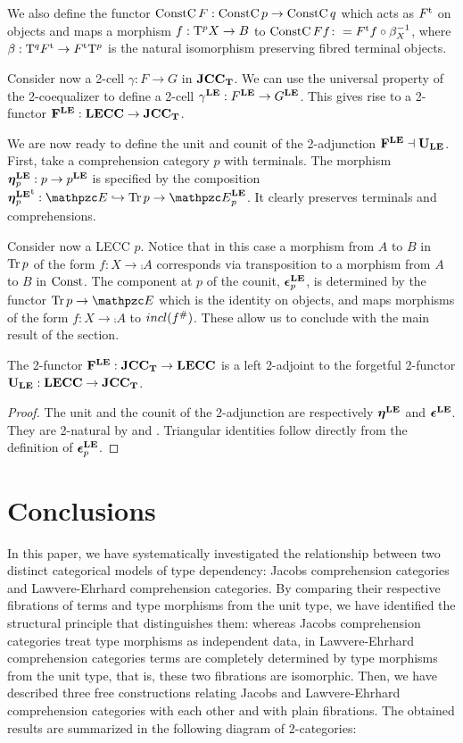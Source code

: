 \documentclass{lmcs} %
\theoremstyle{plain}\newtheorem{satz}[thm]{Satz} %
\begin{document}
			We also define the functor $\mathop{\mathrm{ConstC}}\nolimits{F}:\mathop{\mathrm{ConstC}}\nolimits{p}\to\mathop{\mathrm{ConstC}}\nolimits{q}$ which acts as ${F}^{\mathrm{t}}$ on objects and maps a morphism $f:\mathrm{T}^{p}X\to B$ to $\mathop{\mathrm{ConstC}}\nolimits{F}f\colon = {F}^{\mathrm{t}}f\circ \beta^{-1}_X$, where $\beta:\mathrm{T}^{q}{F}^{\mathrm{t}}\to{F}^{\mathrm{t}}\mathrm{T}^{p}$ is the natural isomorphism preserving fibred terminal objects.
			
			Consider now a 2-cell $\gamma:F\to G$ in $\mathbf{JCC_T}$. We can use the universal property of the 2-coequalizer to define a 2-cell ${\gamma}^{\mathbf{LE}}:{F}^{\mathbf{LE}}\to{G}^{\mathbf{LE}}$. This gives rise to a 2-functor $\mathbf{F^{LE}}:\mathbf{LECC}\to\mathbf{JCC_T}$.
			
			We are now ready to define the unit and counit of the 2-adjunction $\mathbf{F^{LE}}\dashv\mathbf{U_{LE}}$. First, take a comprehension category $p$ with terminals. The morphism $\boldsymbol{\eta}^{\mathbf{LE}}_{p}:p\to{p}^{\mathbf{LE}}$ is specified by the composition $\ft{\LEun{p}}:\ct{E}\hookrightarrow\Tr{p}\to\LEDomE{p}$. It clearly preserves terminals and comprehensions.
			
			Consider now a LECC $p$. Notice that in this case a morphism from $A$ to $B$ in $\mathop{\mathrm{Tr}}\nolimits{p}$ of the form $f:X\to\comp{}A$ corresponds via transposition to a morphism from $A$ to $B$ in $\mathop{\mathrm{Const}}\nolimits$. The component at $p$ of the counit, $\boldsymbol{\epsilon}^{\mathbf{LE}}_{p}$, is determined by the functor $\Tr{p}\to \ct{E}$ which is the identity on objects, and maps morphisms of the form $f:X\to\comp{}A$ to $incl (f^{\#})$. These allow us to conclude with the main result of the section.
			
			\begin{thm}
				The 2-functor $\mathbf{F^{LE}}:\mathbf{JCC_T}\to\mathbf{LECC}$ is a left 2-adjoint to the forgetful 2-functor $\mathbf{U_{LE}}:\mathbf{LECC}\to \mathbf{JCC_T}$.
			\end{thm}
			
			\begin{proof}
				The unit and the counit of the 2-adjunction are respectively $\boldsymbol{\eta}^{\mathbf{LE}}_{}$ and $\boldsymbol{\epsilon}^{\mathbf{LE}}_{}$. They are 2-natural by  and . Triangular identities follow directly from the definition of $\boldsymbol{\epsilon}^{\mathbf{LE}}_{p}$.
			\end{proof}



			\section{Conclusions}
			\label{sect:conclu} 

In this paper, we have systematically investigated the relationship between two distinct categorical models of type dependency: Jacobs comprehension categories and Lawvere-Ehrhard comprehension categories. 
By comparing their respective fibrations of terms and type morphisms from the unit type, we have identified the structural principle that distinguishes them: 
whereas Jacobs comprehension categories treat type morphisms as independent data, 
in Lawvere-Ehrhard comprehension categories terms are completely determined by type morphisms from the unit type,  that is, 
 these two fibrations are isomorphic. 
% 
Then, we have described three free constructions relating Jacobs and Lawvere-Ehrhard comprehension categories with each other and with plain fibrations. 
The obtained results are summarized in the following diagram of 2-categories: 
\end{document}
